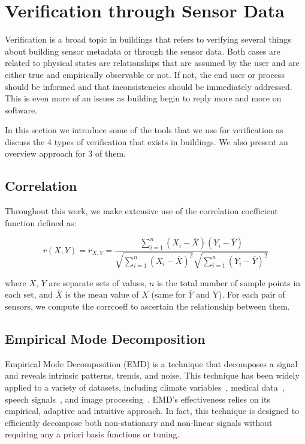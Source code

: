 \section{Verification through Sensor Data}
Verification is a broad topic in buildings that refers to verifying several things about building sensor metadata or through
the sensor data.  Both cases are related to physical states are relationships that are assumed by the user and are either
true and empirically observable or not.  If not, the end user or process should be informed and that inconsistencies should
be immediately addressed.  This is even more of an issues as building begin to reply more and more on software.

In this section we introduce some of the tools that we use for verification as discuss the 4 types of verification
that exists in buildings.  We also present an overview approach for 3 of them.

\subsection{Correlation}
Throughout this work, we make extensive use of the correlation coefficient function defined as: 

\begin{displaymath}
r(X,Y) = r_{X, Y} = \frac{\sum_{i=1}^{n} (X_{i} - \overline{X})(Y_{i} - \overline{Y})}
{\sqrt{\sum_{i=1}^{n} (X_{i} - \overline{X})^2}\sqrt{\sum_{i=1}^{n} (Y_{i} - \overline{Y})^2}}
\end{displaymath}

where $X$, $Y$ are separate sets of values, $n$ is the total number of sample points in 
each set, and $\overline{X}$ is the mean value of $X$ (same for $\overline{Y}$ and Y).  %
For each pair of sensors, we compute the corrcoeff to ascertain the relationship between them.



\subsection{Empirical Mode Decomposition} \label{emd}
Empirical Mode Decomposition (EMD) \cite{huang:emd1998} is a technique that decomposes a signal and reveals intrinsic patterns, 
trends, and noise.
This technique has been widely applied to a variety of datasets, including climate variables~\cite{lee:climateEMD2011}, medical data~\cite{blanco:bioMed2008}, speech signals~\cite{huang:signalProc2006,hasan:ieeeletter2009}, and image processing~\cite{nunes:vision2005}.
EMD's effectiveness relies on its empirical, adaptive and intuitive approach.
In fact, this technique is designed to efficiently decompose both non-stationary and non-linear signals without requiring any 
a priori basis functions or tuning.  

